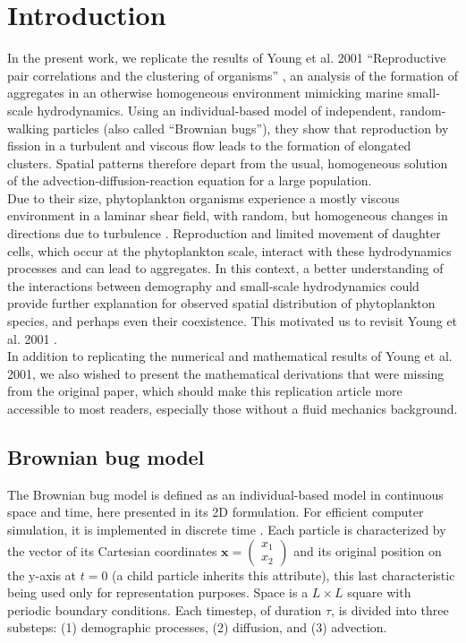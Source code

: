 
\section*{Introduction}

In the present work, we replicate the results of Young et al. 2001 ``Reproductive pair correlations and the clustering of organisms'' \cite{young_reproductive_2001}, an analysis of the formation of aggregates in an otherwise homogeneous environment mimicking marine small-scale hydrodynamics. Using an individual-based model of independent, random-walking particles (also called ``Brownian bugs''), they show that reproduction by fission in a turbulent \cite{tennekes1972first} and viscous flow leads to the formation of elongated clusters. Spatial patterns therefore depart from the usual, homogeneous solution of the advection-diffusion-reaction equation for a large population. \\

Due to their size, phytoplankton organisms experience a mostly viscous environment in a laminar shear field, with random, but homogeneous changes in directions due to turbulence  \citep{dusenbery2009living, peters_effects_2000}. Reproduction and limited movement of daughter cells, which occur at the phytoplankton scale, interact with these hydrodynamics processes and can lead to aggregates.  In this context, a better understanding of the interactions between demography and small-scale hydrodynamics could provide further explanation for observed spatial distribution of phytoplankton species, and perhaps even their coexistence. This motivated us to revisit Young et al. 2001 \cite{young_reproductive_2001}. \\

In addition to replicating the numerical and mathematical results of Young et al. 2001, we also wished to present the mathematical derivations that were missing from the original paper, which should make this replication article more accessible to most readers, especially those without a fluid mechanics background. 

\subsection*{Brownian bug model}
The Brownian bug model is defined as an individual-based model in continuous space and time, here presented in its 2D formulation. For efficient computer simulation, it is implemented in discrete time \cite{young_reproductive_2001}. Each particle is characterized by the vector of its Cartesian coordinates $\boldsymbol{x}=\begin{pmatrix} 
      x_1\\ 
      x_2 
\end{pmatrix}$ and its original position on the y-axis at $t=0$ (a child particle inherits this attribute), this last characteristic being used only for representation purposes. Space is a $L\times L$ square with periodic boundary conditions. Each timestep, of duration $\tau$, is divided into three substeps: (1) demographic processes, (2) diffusion, and (3) advection. \\

